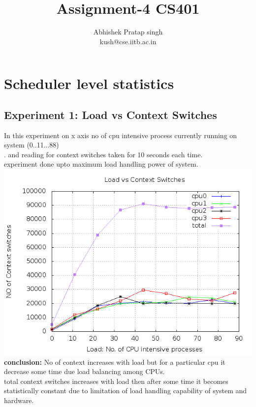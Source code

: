 \documentclass[a4paper,11pt]{report}
\title{{\bf Assignment-4 CS401} }
\author{Abhishek Pratap singh\\
kush@cse.iitb.ac.in}
\begin{document}
\maketitle
\tableofcontents
 \section{Scheduler level statistics}
 \subsection{Experiment 1: Load vs Context Switches}
  In this experiment on x axis no of cpu intensive process currently running on system (0..11...88)\\ .
  and reading for context switches taken for 10 seconds each time.\\
  experiment done upto maximum load handling power of system.\\
  \includegraphics[scale=0.6]{loadvscs.png}
  \\{\bf conclusion:} No of context increases with load but for a particular cpu it decrease some time due load balancing among CPUs.\\
   total context switches increases with load then after some time it becomes statistically constant due to limitation of load handling capability of system and hardware.
\end{document}
